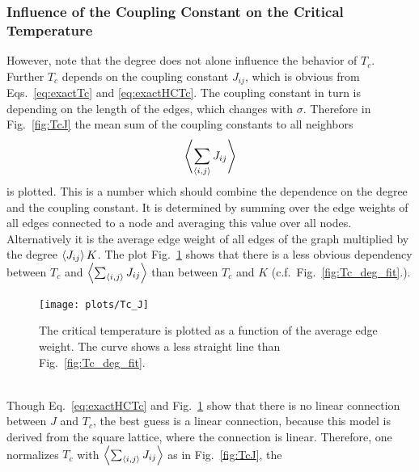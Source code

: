     \subsubsection{Influence of the Coupling Constant on the Critical Temperature}%
    \label{sssec:J}
        However, note that the degree does not alone influence the behavior of \(T_c\).
        Further \(T_c\) depends on the coupling constant \(J_{ij}\), which is
        obvious from Eqs.\ \eqref{eq:exactTc} and \eqref{eq:exactHCTc}. The
        coupling constant in turn is depending on the length of the edges,
        which changes with \(\sigma\).
        Therefore  in Fig.\ \ref{fig:TcJ}
        the mean sum of the coupling constants to all neighbors
        \begin{equation}
            \left< \sum_{\left< i,j \right>} J_{ij} \right>
        \end{equation}
        is plotted. This is a number which should combine the dependence on
        the degree and the coupling constant. It is determined by summing
        over the edge weights of all edges connected to a node and averaging
        this value over all nodes. Alternatively it is the average edge weight
        of all edges of the graph multiplied by the degree \(\left< J_{ij} \right> K\).
        The plot Fig.\ \ref{fig:Tc_J} shows that
        there is a less obvious dependency between \(T_c\) and \(\left< \sum_{\left< i,j \right>} J_{ij} \right>\)
        than between \(T_c\) and \(K\) (c.f.\ Fig.\ \ref{fig:Tc_deg_fit}.).
        \begin{figure}[htbp]
            \centering
            \texttt{[image: plots/Tc\_J]}
            \caption[Critical Temperature as a Function of the Degree of the Graph]
            {
                The critical temperature is plotted as a function of the
                average edge weight. The curve shows a less straight line
                than Fig.\ \ref{fig:Tc_deg_fit}.
            }
            \label{fig:Tc_J}
        \end{figure}\\
        Though Eq.\ \eqref{eq:exactHCTc} and Fig.\ \ref{fig:Tc_J} show
        that there is no linear connection between \(J\) and \(T_c\), the best guess
        is a linear connection, because this model is derived from the
        square lattice, where the connection is linear. Therefore, one
        normalizes \(T_c\) with \(\left< \sum_{\left< i,j \right>} J_{ij} \right>\) as in
        Fig.\ \ref{fig:TcJ}, the
